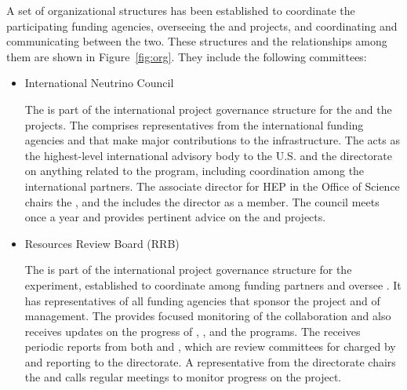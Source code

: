 A set  of  organizational structures  has been established  to
coordinate  the  participating  funding agencies,
overseeing the  and  projects,
and coordinating and communicating between the 
two. These structures and the relationships among them are shown 
in Figure~\ref{fig:org}. They include %
the following committees:
\begin{itemize}
\item International Neutrino Council 

The  is part of the international project governance structure for the   and the   projects. The  comprises representatives from the international funding agencies and   that make major contributions to the infrastructure. 
The  acts as the highest-level international advisory body to the U.S.   and the   directorate on anything related to the program, including coordination among the international partners. The associate director for HEP in the  Office of Science chairs the , and the  includes the   director as a member. The council meets once a year and provides pertinent advice on the  and   projects.

\item Resources Review Board (RRB)

The    is part of the international project governance structure for the   experiment, established to coordinate among funding partners and oversee . It has representatives of all funding agencies that sponsor the project and  of  management. The   provides focused monitoring of the  collaboration and also receives updates on the progress of ,  , and the  programs. The   receives periodic reports from both  and , which are review committees for  charged by and reporting to the  directorate. A representative from the  directorate chairs the  and calls regular meetings to monitor progress on the  project.


\end{itemize}

